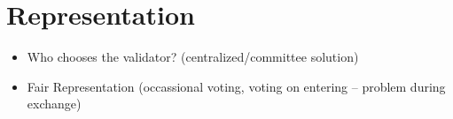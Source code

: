 \section{Representation}
\begin{itemize}
    \item Who chooses the validator? (centralized/committee solution)
    \item Fair Representation
          (occassional voting, voting on entering -- problem during exchange)
\end{itemize}
